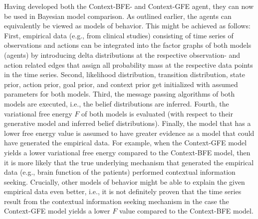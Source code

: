 Having developed both the Context-BFE- and Context-GFE agent, they can now be used in Bayesian model comparison. As outlined earlier, the agents can equivalently be viewed as models of behavior. This might be achieved as follows: First, empirical data (e.g., from clinical studies) consisting of time series of observations and actions can be integrated into the factor graphs of both models (agents) by introducing delta distributions at the respective observation- and action related edges that assign all probability mass at the respective data points in the time series. Second, likelihood distribution, transition distribution, state prior, action prior, goal prior, and context prior get initialized with assumed parameters for both models. Third, the message passing algorithms of both models are executed, i.e., the belief distributions are inferred. Fourth, the variational free energy \(F\) of both models is evaluated (with respect to their generative model and inferred belief distributions).
Finally, the model that has a lower free energy value is assumed to have greater evidence as a model that could have generated the empirical data. For example, when the Context-GFE model yields a lower variational free energy compared to the Context-BFE model, then it is more likely that the true underlying mechanism that generated the empirical data (e.g., brain function of the patients) performed contextual information seeking. Crucially, other models of behavior might be able to explain the given empirical data even better, i.e., it is not definitely proven that the time series result from the contextual information seeking mechanism in the case the Context-GFE model yields a lower \(F\) value compared to the Context-BFE model.